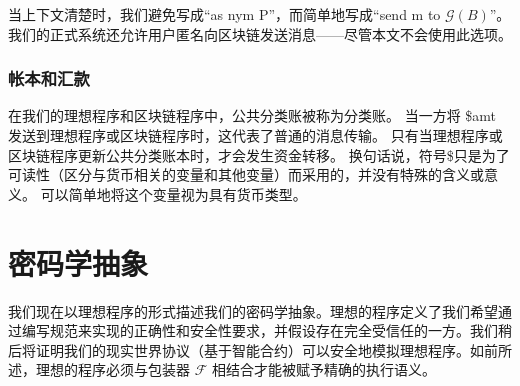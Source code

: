 \documentclass{xduugtrans}
\begin{document}
当上下文清楚时，我们避免写成“as nym P”，而简单地写成“send m to $\mathcal{G} ( B )$”。我们的正式系统还允许用户匿名向区块链发送消息——尽管本文不会使用此选项。

\subsection{帐本和汇款}

在我们的理想程序和区块链程序中，公共分类账被称为分类账。 当一方将 \$amt 发送到理想程序或区块链程序时，这代表了普通的消息传输。 只有当理想程序或区块链程序更新公共分类账本时，才会发生资金转移。 换句话说，符号\$只是为了可读性（区分与货币相关的变量和其他变量）而采用的，并没有特殊的含义或意义。 可以简单地将这个变量视为具有货币类型。

\chapter{密码学抽象}

我们现在以理想程序的形式描述我们的密码学抽象。理想的程序定义了我们希望通过编写规范来实现的正确性和安全性要求，并假设存在完全受信任的一方。我们稍后将证明我们的现实世界协议（基于智能合约）可以安全地模拟理想程序。如前所述，理想的程序必须与包装器 $\mathcal{F}$ 相结合才能被赋予精确的执行语义。
\end{document}

